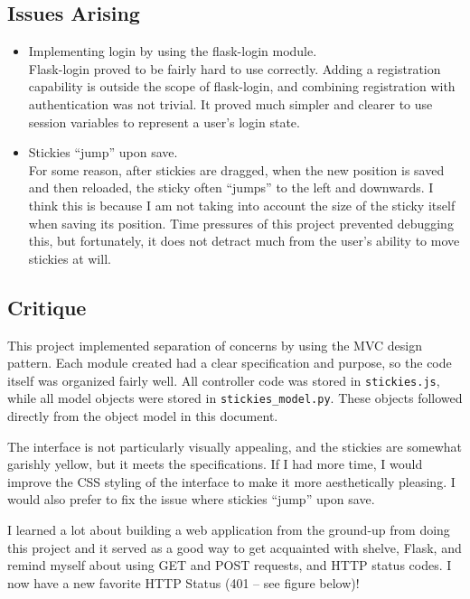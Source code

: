 \documentclass[11pt,letterpaper]{article}
\begin{document}
\subsection{Issues Arising}
\begin{itemize}
\item Implementing login by using the flask-login module. \\
Flask-login proved to be fairly hard to use correctly. Adding a registration capability is outside the scope of flask-login, and combining registration with authentication was not trivial. It proved much simpler and clearer to use session variables to represent a user's login state.
\item Stickies ``jump'' upon save.\\
For some reason, after stickies are dragged, when the new position is saved and then reloaded, the sticky often ``jumps'' to the left and downwards. I think this is because I am not taking into account the size of the sticky itself when saving its position. Time pressures of this project prevented debugging this, but fortunately, it does not detract much from the user's ability to move stickies at will.
\end{itemize}

\subsection{Critique}
This project implemented separation of concerns by using the MVC design pattern. Each module created had a clear specification and purpose, so the code itself was organized fairly well. All controller code was stored in \texttt{stickies.js}, while all model objects were stored in \texttt{stickies\_model.py}. These objects followed directly from the object model in this document.

The interface is not particularly visually appealing, and the stickies are somewhat garishly yellow, but it meets the specifications. If I had more time, I would improve the CSS styling of the interface to make it more aesthetically pleasing. I would also prefer to fix the issue where stickies ``jump'' upon save.

I learned a lot about building a web application from the ground-up from doing this project and it served as a good way to get acquainted with shelve, Flask, and remind myself about using GET and POST requests, and HTTP status codes. I now have a new favorite HTTP Status (401 -- see figure below)!
\end{document}
